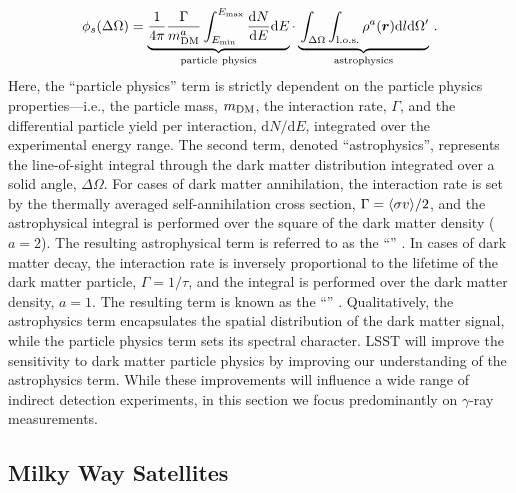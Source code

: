 \begin{equation}
   \phi_s(\Delta\Omega) =
    \underbrace{ \frac{1}{4\pi} \frac{\Gamma}{m_{\DM}^{a}}\int^{E_{\max}}_{E_{\min}}\frac{\text{d}N}{\text{d}E}\text{d}E}_{\rm particle\ physics}
    \cdot
    \underbrace{\vphantom{\int_{E_{\min}}} \int_{\Delta\Omega}\int_{\rm l.o.s.}\rho^{a}(\vect{r})\text{d}l\text{d}\Omega '}_{\rm astrophysics}\,.
    \label{eqn:indirect}
\end{equation}
\noindent Here, the ``particle physics'' term is strictly dependent on the particle physics properties---i.e., the particle mass, $m_{\mathrm{DM}}$,  the interaction rate, $\Gamma$, and the differential particle yield per interaction, $\text{d}N/\text{d}E$, integrated over the experimental energy range.
The second term, denoted ``astrophysics'', represents the line-of-sight integral through the dark matter distribution integrated over a solid angle, $\Delta\Omega$. 
For cases of dark matter annihilation, the interaction rate is set by the thermally averaged self-annihilation cross section, $\Gamma = \langle \sigma v \rangle/2$, and the astrophysical integral is performed over the square of the dark matter density ($a=2$). 
The resulting astrophysical term is referred to as the ``\Jfactor'' \citep[\eg,][]{1998APh.....9..137B}. 
In cases of dark matter decay, the interaction rate is inversely proportional to the lifetime of the dark matter particle, $\Gamma = 1/\tau$, and the integral is performed over the dark matter density, $a=1$. 
The resulting term is known as the ``\Dfactor'' \citep[\eg][]{1408.0002}.
Qualitatively, the astrophysics term encapsulates the spatial distribution of the dark matter signal, while the particle physics term sets its spectral character. 
LSST will improve the sensitivity to dark matter particle physics by improving our understanding of the astrophysics term.
While these improvements will influence a wide range of indirect detection experiments, in this section we focus predominantly on $\gamma$-ray measurements.


\subsection{Milky Way Satellites }

